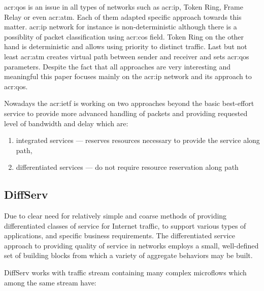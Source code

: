 \documentclass[11pt]{book}
\begin{document}

      \gls{acr:qos} is an issue in all types of networks such as \gls{acr:ip}, Token Ring, Frame Relay or even
      \gls{acr:atm}.  Each of them adapted specific approach towards this matter. \gls{acr:ip} network for instance is
      non-deterministic although there is a possiblity of packet classification using \gls{acr:cos} field. Token Ring on
      the other hand is deterministic and allows using priority to distinct traffic. Last but not least \gls{acr:atm}
      creates virtual path between sender and receiver and sets \gls{acr:qos} parameters. Despite the fact that all
      approaches are very interesting and meaningful this paper focuses mainly on the \gls{acr:ip} network and its approach to
      \gls{acr:qos}.


      Nowadays the \gls{acr:ietf} is working on two approaches beyond the basic best-effort service to provide more
      advanced handling of packets and providing requested level of bandwidth and delay which are:

      \begin{enumerate}
        \item integrated services --- reserves resources necessary to provide the service along path,
        \item differentiated services --- do not require resource reservation along path
      \end{enumerate}


      \subsection{DiffServ}

        Due to clear need for relatively simple and coarse methods of providing differentiated classes of service for
        Internet traffic, to support various types of applications, and specific business requirements. The
        differentiated service approach to providing quality of service in networks employs a small, well-defined set of
        building blocks from which a variety of aggregate behaviors may be built. \cite{qos}

        DiffServ works with traffic stream containing many complex microflows which among the same stream have:
\end{document}
